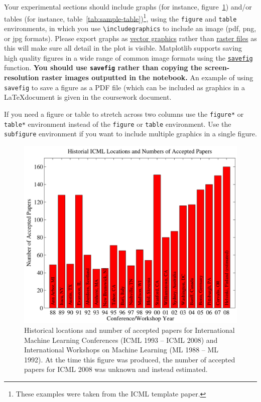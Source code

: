 \documentclass{article}
\begin{document}
Your experimental sections should include graphs (for instance, figure~\ref{fig:sample-graph}) and/or tables (for instance, table~\ref{tab:sample-table})\footnote{These examples were taken from the ICML template paper.}, using the \verb+figure+ and \verb+table+ environments, in which you use \verb+\includegraphics+ to include an image (pdf, png, or jpg formats).  Please export graphs as 
\href{https://en.wikipedia.org/wiki/Vector_graphics}{vector graphics}
rather than \href{https://en.wikipedia.org/wiki/Raster_graphics}{raster
files} as this will make sure all detail in the plot is visible.
Matplotlib supports saving high quality figures in a wide range of
common image formats using the
\href{http://matplotlib.org/api/pyplot_api.html\#matplotlib.pyplot.savefig}{\texttt{savefig}}
function. \textbf{You should use \texttt{savefig} rather than copying
the screen-resolution raster images outputted in the notebook.} An
example of using \texttt{savefig} to save a figure as a PDF file (which
can be included as graphics in a \LaTeX document is given in the coursework document.

If you need a figure or table to stretch across two columns use the \verb+figure*+ or \verb+table*+ environment instead of the \verb+figure+ or \verb+table+ environment.  Use the \verb+subfigure+ environment if you want to include multiple graphics in a single figure.

\begin{figure}[tb]
\vskip 5mm
\begin{center}
\centerline{\includegraphics[width=\columnwidth]{./pic/icml_numpapers}}
\caption{Historical locations and number of accepted papers for International
  Machine Learning Conferences (ICML 1993 -- ICML 2008) and
  International Workshops on Machine Learning (ML 1988 -- ML
  1992). At the time this figure was produced, the number of
  accepted papers for ICML 2008 was unknown and instead estimated.}
\label{fig:sample-graph}
\end{center}
\vskip -5mm
\end{figure} 
\end{document}
